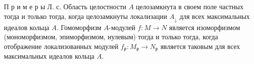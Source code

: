 \documentclass[10pt]{article}
\begin{document}
П р и м е р ы Л. с. Область целостности $A$ целозамкнута в своем поле частных тогда и только тогда, когда целозамкнуты локализации $A_{\downarrow}$ для всех максимальных идеалов кольца $A$. Гомоморфизм $A$-модулей $f: M \rightarrow N$ является изоморфизмом (мономорфизмом, эпиморфизмом, нулевым) тогда и только тогда, когда отображение локализованных модулей $f_{\mathfrak{p}}: M_{\mathfrak{p}} \rightarrow N_{\mathfrak{p}}$ является таковым для всех максимальных идеалов кольца $A$.
\end{document}
